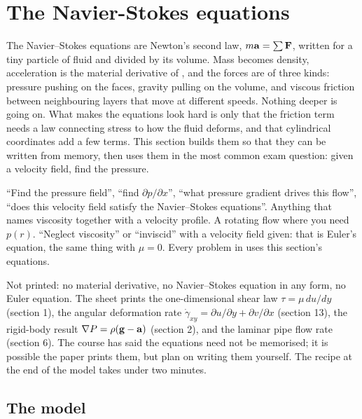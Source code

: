 \section{The Navier-Stokes equations}
\label{sec:navierstokes}

The Navier--Stokes equations are Newton's second law, $m\mathbf{a} = \sum\mathbf{F}$, written for a tiny particle of fluid and divided by its volume. Mass becomes density, acceleration is the material derivative of , and the forces are of three kinds: pressure pushing on the faces, gravity pulling on the volume, and viscous friction between neighbouring layers that move at different speeds. Nothing deeper is going on. What makes the equations look hard is only that the friction term needs a law connecting stress to how the fluid deforms, and that cylindrical coordinates add a few terms. This section builds them so that they can be written from memory, then uses them in the most common exam question: given a velocity field, find the pressure.

\begin{recognise}
``Find the pressure field'', ``find $\partial p/\partial x$'', ``what pressure gradient drives this flow'', ``does this velocity field satisfy the Navier--Stokes equations''. Anything that names viscosity together with a velocity profile. A rotating flow where you need $p(r)$. ``Neglect viscosity'' or ``inviscid'' with a velocity field given: that is Euler's equation, the same thing with $\mu = 0$. Every problem in  uses this section's equations.
\end{recognise}

\begin{onsheet}
Not printed: no material derivative, no Navier--Stokes equation in any form, no Euler equation. The sheet prints the one-dimensional shear law $\tau = \mu\,du/dy$ (section 1), the angular deformation rate $\dot\gamma_{xy} = \partial u/\partial y + \partial v/\partial x$ (section 13), the rigid-body result $\nabla P = \rho(\mathbf{g} - \mathbf{a})$ (section 2), and the laminar pipe flow rate (section 6). The course has said the equations need not be memorised; it is possible the paper prints them, but plan on writing them yourself. The recipe at the end of the model takes under two minutes.
\end{onsheet}

\subsection*{The model}

